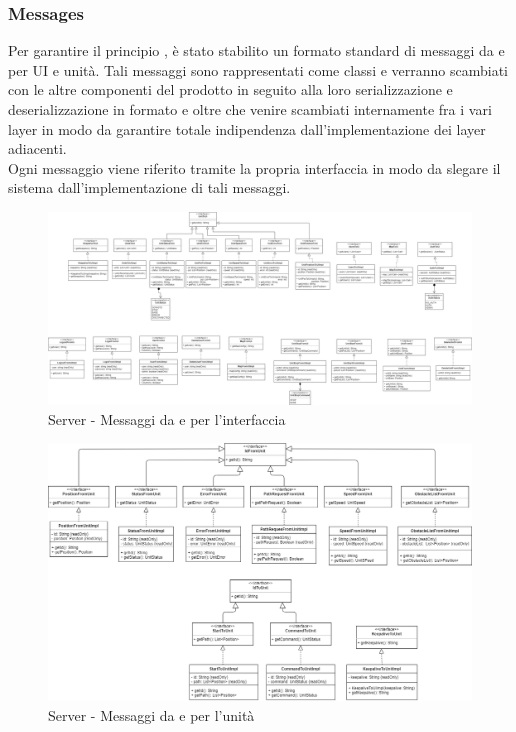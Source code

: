 \subsubsection{Messages}
Per garantire il principio , è stato stabilito un formato standard di messaggi da e per UI e unità. Tali messaggi sono rappresentati come classi  e verranno scambiati con le altre componenti del prodotto in seguito alla loro serializzazione e deserializzazione in formato  e oltre che venire scambiati internamente fra i vari layer in modo da garantire totale indipendenza dall'implementazione dei layer adiacenti.\\
Ogni messaggio viene riferito tramite la propria interfaccia in modo da slegare il sistema dall'implementazione di tali messaggi.

\begin{landscape}
    \begin{figure}[H]
        \centering
        \includegraphics[width=26cm]{img/server_from_to_ui.png}
        \caption{Server - Messaggi da e per l'interfaccia}
    \end{figure}
\end{landscape}

\begin{landscape}
    \begin{figure}[H]
        \centering
        \includegraphics[width=24cm]{img/server_from_to_unit.png}
        \caption{Server - Messaggi da e per l'unità}
    \end{figure}
\end{landscape}

